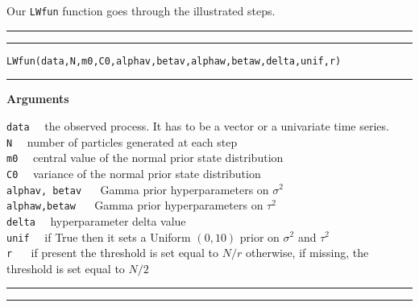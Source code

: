 \documentclass[
]{article}
\begin{document}
Our \texttt{LWfun} function goes through the illustrated steps.\\

\hrule
\hrule

\hfill\break
\texttt{LWfun(data,N,m0,C0,alphav,betav,alphaw,betaw,delta,unif,r)}\\

\hrule

\textbf{Arguments}

\texttt{data} ~~the observed process. It has to be a vector or a
univariate time series.\\
\texttt{N} ~~number of particles generated at each step\\
\texttt{m0} ~~central value of the normal prior state distribution\\
\texttt{C0} ~~variance of the normal prior state distribution\\
\texttt{alphav, betav} ~~ Gamma prior hyperparameters on
\(\sigma^{2}\)\\
\texttt{alphaw,betaw} ~~ Gamma prior hyperparameters on \(\tau^{2}\)\\
\texttt{delta} ~~hyperparameter delta value\\
\texttt{unif} ~~if True then it sets a Uniform \((0,10)\) prior on
\(\sigma^{2}\) and \(\tau^{2}\)\\
\texttt{r} ~~ if present the threshold is set equal to \(N/r\)
otherwise, if missing, the threshold is set equal to \(N/2\)

\hrule
\hrule
\end{document}
